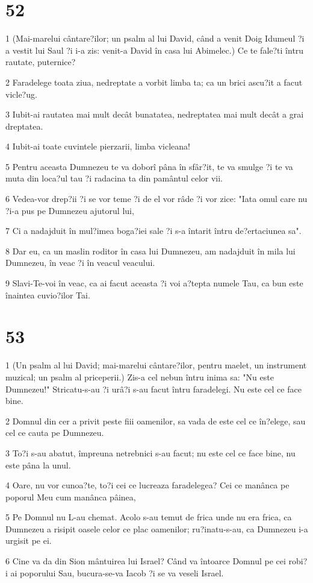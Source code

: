 \chapter{52}

\par 1 (Mai-marelui cântare?ilor; un psalm al lui David, când a venit Doig Idumeul ?i a vestit lui Saul ?i i-a zis: venit-a David în casa lui Abimelec.) Ce te fale?ti întru rautate, puternice?
\par 2 Faradelege toata ziua, nedreptate a vorbit limba ta; ca un brici ascu?it a facut vicle?ug.
\par 3 Iubit-ai rautatea mai mult decât bunatatea, nedreptatea mai mult decât a grai dreptatea.
\par 4 Iubit-ai toate cuvintele pierzarii, limba vicleana!
\par 5 Pentru aceasta Dumnezeu te va doborî pâna în sfâr?it, te va smulge ?i te va muta din loca?ul tau ?i radacina ta din pamântul celor vii.
\par 6 Vedea-vor drep?ii ?i se vor teme ?i de el vor râde ?i vor zice: "Iata omul care nu ?i-a pus pe Dumnezeu ajutorul lui,
\par 7 Ci a nadajduit în mul?imea boga?iei sale ?i s-a întarit întru de?ertaciunea sa".
\par 8 Dar eu, ca un maslin roditor în casa lui Dumnezeu, am nadajduit în mila lui Dumnezeu, în veac ?i în veacul veacului.
\par 9 Slavi-Te-voi în veac, ca ai facut aceasta ?i voi a?tepta numele Tau, ca bun este înaintea cuvio?ilor Tai.

\chapter{53}

\par 1 (Un psalm al lui David; mai-marelui cântare?ilor, pentru maelet, un instrument muzical; un psalm al priceperii.) Zis-a cel nebun întru inima sa: "Nu este Dumnezeu!" Stricatu-s-au ?i urâ?i s-au facut întru faradelegi. Nu este cel ce face bine.
\par 2 Domnul din cer a privit peste fiii oamenilor, sa vada de este cel ce în?elege, sau cel ce cauta pe Dumnezeu.
\par 3 To?i s-au abatut, împreuna netrebnici s-au facut; nu este cel ce face bine, nu este pâna la unul.
\par 4 Oare, nu vor cunoa?te, to?i cei ce lucreaza faradelegea? Cei ce manânca pe poporul Meu cum manânca pâinea,
\par 5 Pe Domnul nu L-au chemat. Acolo s-au temut de frica unde nu era frica, ca Dumnezeu a risipit oasele celor ce plac oamenilor; ru?inatu-s-au, ca Dumnezeu i-a urgisit pe ei.
\par 6 Cine va da din Sion mântuirea lui Israel? Când va întoarce Domnul pe cei robi?i ai poporului Sau, bucura-se-va Iacob ?i se va veseli Israel.


